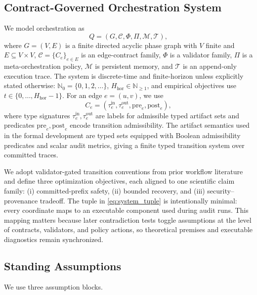 \documentclass{article} %
\begin{document}
\subsection{Contract-Governed Orchestration System}
We model orchestration as
\begin{equation}
Q = (G,\mathcal{C},\Phi,\Pi,\mathcal{M},\mathcal{T}),
\label{eq:system_tuple}
\end{equation}
where $G=(V,E)$ is a finite directed acyclic phase graph with $V$ finite and $E\subseteq V\times V$, $\mathcal{C}=\{C_e\}_{e\in E}$ is an edge-contract family, $\Phi$ is a validator family, $\Pi$ is a meta-orchestration policy, $\mathcal{M}$ is persistent memory, and $\mathcal{T}$ is an append-only execution trace. The system is discrete-time and finite-horizon unless explicitly stated otherwise: $\mathbb{N}_0=\{0,1,2,\ldots\}$, $H_{\mathrm{hor}}\in\mathbb{N}_{\ge 1}$, and empirical objectives use $t\in\{0,\ldots,H_{\mathrm{hor}}-1\}$. For an edge $e=(u,v)$, we use
\begin{equation}
C_e=(\tau^{\mathrm{in}}_e,\tau^{\mathrm{out}}_e,\mathrm{pre}_e,\mathrm{post}_e),
\label{eq:edge_contract}
\end{equation}
where type signatures $\tau^{\mathrm{in}}_e,\tau^{\mathrm{out}}_e$ are labels for admissible typed artifact sets and predicates $\mathrm{pre}_e,\mathrm{post}_e$ encode transition admissibility. The artifact semantics used in the formal development are typed sets equipped with Boolean admissibility predicates and scalar audit metrics, giving a finite typed transition system over committed traces.

We adopt validator-gated transition conventions from prior workflow literature \citep{sawant2026,chang2025,song2026b} and define three optimization objectives, each aligned to one scientific claim family: (i) committed-prefix safety, (ii) bounded recovery, and (iii) security--provenance tradeoff.
The tuple in \eqref{eq:system_tuple} is intentionally minimal: every coordinate maps to an executable component used during audit runs. This mapping matters because later contradiction tests toggle assumptions at the level of contracts, validators, and policy actions, so theoretical premises and executable diagnostics remain synchronized.

\subsection{Standing Assumptions}
We use three assumption blocks.
\end{document}
